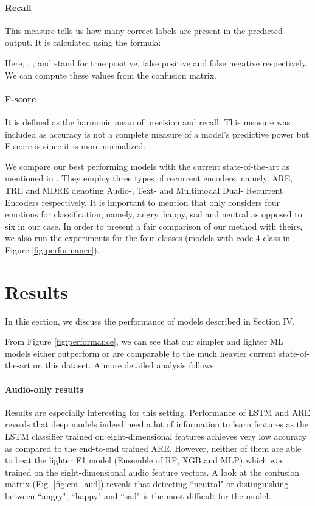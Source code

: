 \documentclass[conference]{IEEEtran}
\begin{document}
\paragraph{Recall} This measure tells us how many correct labels are present in the predicted output. It is calculated using the formula:



Here, , , and  stand for true positive, false positive and false negative respectively. We can compute these values from the confusion matrix.

\paragraph{F-score} It is defined as the harmonic mean of precision and recall. This measure was included as accuracy is not a complete measure of a model's predictive power but F-score is since it is more normalized.

We compare our best performing models with the current state-of-the-art as mentioned in \cite{yoon2018multimodal}. They employ three types of recurrent encoders, namely, ARE, TRE and MDRE denoting Audio-, Text- and Multimodal Dual- Recurrent Encoders respectively. It is important to mention that \cite{yoon2018multimodal} only considers four emotions for classification, namely, angry, happy, sad and neutral as opposed to six in our case. In order to present a fair comparison of our method with theirs, we also run the experiments for the four classes (models with code 4-class in Figure \ref{fig:performance}).

\section{Results}
In this section, we discuss the performance of models described in Section IV.

From Figure \ref{fig:performance}, we can see that our simpler and lighter ML models either outperform or are comparable to the much heavier current state-of-the-art on this dataset. A more detailed analysis follows:

\paragraph{Audio-only results} Results are especially interesting for this setting. Performance of LSTM and ARE reveals that deep models indeed need a lot of information to learn features as the LSTM classifier trained on eight-dimensional features achieves very low accuracy as compared to the end-to-end trained ARE. However, neither of them are able to beat the lighter E1 model (Ensemble of RF, XGB and MLP) which was trained on the eight-dimensional audio feature vectors. A look at the confusion matrix (Fig. \ref{fig:cm_aud}) reveals that detecting ``neutral" or distinguishing between ``angry", ``happy" and ``sad" is the most difficult for the model.
\end{document}

